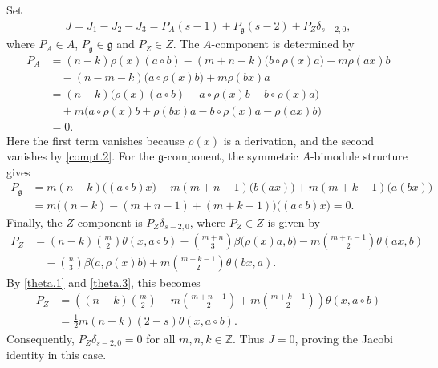 \documentclass[12pt]{article}
\numberwithin{equation}{section}
\theoremstyle{definition}
\theoremstyle{plain}
\newcommand{\bZ}{\ensuremath{\mathbb{Z}}}
\newcommand{\fg}{\mathfrak{g}}
\begin{document}
Set
\begin{align*}
    J=J_1-J_2-J_3=P_A(s-1)+P_{\fg}(s-2)+P_Z\delta_{s-2,0},
\end{align*}
where $P_A\in A$, $P_{\fg}\in\fg$ and $P_Z\in Z$. The $A$-component is determined by
\begin{align*}
    P_A&=(n-k)\rho(x)(a\circ b)-(m+n-k)\big(b\circ\rho(x)a\big)-m\rho(ax)b\\
    &\quad-(n-m-k)\big(a\circ\rho(x)b\big)+m\rho(bx)a\\
    &=(n-k)\big(\rho(x)(a\circ b)-a\circ\rho(x)b-b\circ\rho(x)a\big)\\
    &\quad+m\big(a\circ\rho(x)b+\rho(bx)a-b\circ\rho(x)a-\rho(ax)b\big)\\
    &=0.
\end{align*}
Here the first term vanishes because $\rho(x)$ is a derivation, and the second vanishes by \eqref{compt.2}. For the $\fg$-component, the symmetric $A$-bimodule structure gives
\begin{align*}
    P_{\fg}&=m(n-k)\big((a\circ b)x\big)-m(m+n-1)\big(b(ax)\big)+m(m+k-1)\big(a(bx)\big)\\
    &=m\big((n-k)-(m+n-1)+(m+k-1)\big)\big((a\circ b)x\big)=0.
\end{align*}
Finally, the $Z$-component is $P_Z\delta_{s-2,0}$, where $P_Z\in Z$ is given by
\begin{align*}
    P_Z&=(n-k)\binom{m}{2}\theta(x,a\circ b)-\binom{m+n}{3}\beta\big(\rho(x)a,b\big)-m\binom{m+n-1}{2}\theta(ax,b)\\
    &\quad-\binom{n}{3}\beta\big(a,\rho(x)b\big)+m\binom{m+k-1}{2}\theta(bx,a).
\end{align*}
By \eqref{theta.1} and \eqref{theta.3}, this becomes
\begin{align*}
    P_Z&=\left((n-k)\binom{m}{2}-m\binom{m+n-1}{2}+m\binom{m+k-1}{2}\right)\theta(x,a\circ b)\\
    &=\frac12m(n-k)(2-s)\theta(x,a\circ b).
\end{align*}
Consequently, $P_Z\delta_{s-2,0}=0$ for all $m,n,k\in\bZ$. Thus $J=0$, proving the Jacobi identity in this case.
\end{document}

